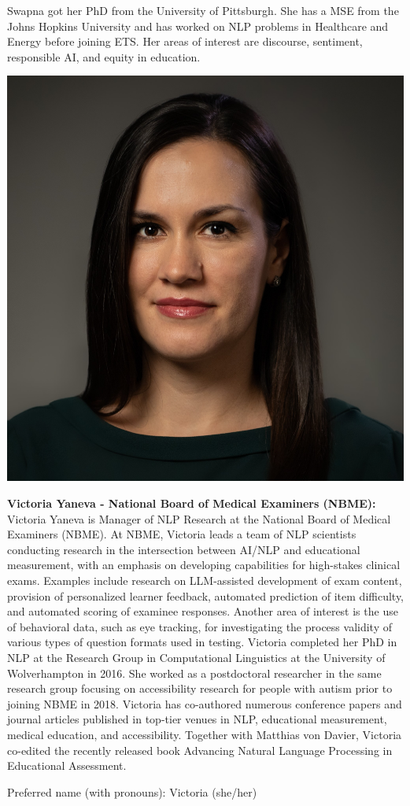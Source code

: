Swapna got her PhD from the University of Pittsburgh. She has a MSE from the Johns Hopkins University and has worked on NLP problems in Healthcare and Energy before joining ETS. Her areas of interest are discourse, sentiment, responsible AI, and equity in education.


\vspace{1em}
\begin{center}
\includegraphics[width=0.4\linewidth]{content/day2/victoria.png}
\end{center}
{\bfseries Victoria Yaneva - National Board of Medical Examiners (NBME):}
Victoria Yaneva is Manager of NLP Research at the National Board of Medical Examiners (NBME). At NBME, Victoria leads a team of NLP scientists conducting research in the intersection between AI/NLP and educational measurement, with an emphasis on developing capabilities for high-stakes clinical exams. Examples include research on LLM-assisted development of exam content, provision of personalized learner feedback, automated prediction of item difficulty, and automated scoring of examinee responses. Another area of interest is the use of behavioral data, such as eye tracking, for investigating the process validity of various types of question formats used in testing. Victoria completed her PhD in NLP at the Research Group in Computational Linguistics at the University of Wolverhampton in 2016. She worked as a postdoctoral researcher in the same research group focusing on accessibility research for people with autism prior to joining NBME in 2018. Victoria has co-authored numerous conference papers and journal articles published in top-tier venues in NLP, educational measurement, medical education, and accessibility. Together with Matthias von Davier, Victoria co-edited the recently released book Advancing Natural Language Processing in Educational Assessment.

Preferred name (with pronouns): Victoria (she/her)


